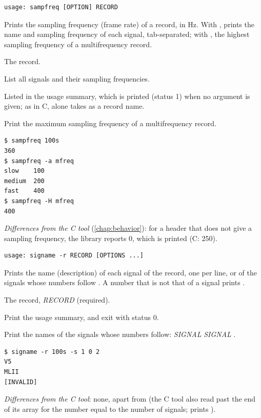 \begin{lstlisting}[style=signature,language={}]
usage: sampfreq [OPTION] RECORD
\end{lstlisting}
Prints the sampling frequency (frame rate) of a record, in Hz. With , prints the
name and sampling frequency of each signal, tab-separated; with , the highest
sampling frequency of a multifrequency record.
\begin{params}
\item[RECORD] The record.
\item[-a] List all signals and their sampling frequencies.
\item[-h] Listed in the usage summary, which is printed (status 1) when no argument is
  given; as in C,  alone takes  as a record name.
\item[-H] Print the maximum sampling frequency of a multifrequency record.
\end{params}
\begin{lstlisting}[style=text]
$ sampfreq 100s
360
$ sampfreq -a mfreq
slow    100
medium  200
fast    400
$ sampfreq -H mfreq
400
\end{lstlisting}
\textit{Differences from the C tool} (\cref{chap:behavior}): for a header that does not
give a sampling frequency, the library reports 0, which is printed (C: 250).

\begin{lstlisting}[style=signature,language={}]
usage: signame -r RECORD [OPTIONS ...]
\end{lstlisting}
Prints the name (description) of each signal of the record, one per line, or of the signals
whose numbers follow . A number that is not that of a signal prints
\code{[INVALID]}.
\begin{params}
\item[-r] The record, \textit{RECORD} (required).
\item[-h] Print the usage summary, and exit with status 0.
\item[-s] Print the names of the signals whose numbers follow:
   \textit{SIGNAL} \code{[}\textit{SIGNAL} \code{...]}.
\end{params}
\begin{lstlisting}[style=text]
$ signame -r 100s -s 1 0 2
V5
MLII
[INVALID]
\end{lstlisting}
\textit{Differences from the C tool}: none, apart from  (the C tool also
read past the end of its array for the number equal to the number of signals; \wfdbx{}
prints \code{[INVALID]}).

